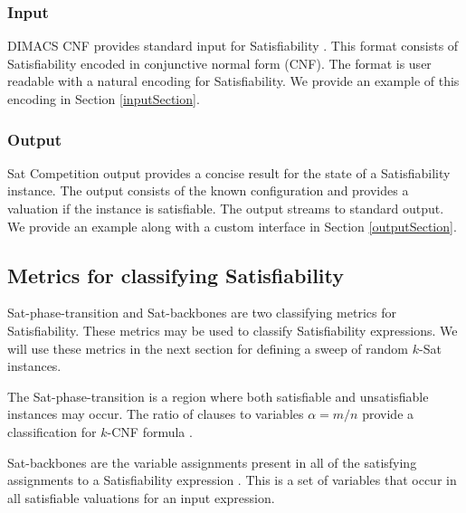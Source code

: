 		\subsubsection{Input}
		
DIMACS CNF provides standard input for {\sc Satisfiability} \cite{dimacsFormat}.  This format consists of {\sc Satisfiability} encoded in conjunctive normal form (CNF).  The format is user readable with a natural encoding for {\sc Satisfiability}.  We provide an example of this encoding in Section \ref{inputSection}.
		
		\subsubsection{Output}
		
{\sc Sat} Competition output \cite{satcompetition} provides a concise result for the state of a {\sc Satisfiability} instance.  The output consists of the known configuration and provides a valuation if the instance is satisfiable.  The output streams to standard output.  We provide an example along with a custom interface in Section \ref{outputSection}.
	
	\subsection{Metrics for classifying {\sc Satisfiability}}

{\sc Sat}-phase-transition and {\sc Sat}-backbones are two classifying metrics for {\sc Satisfiability}.  These metrics may be used to classify {\sc Satisfiability} expressions.  We will use these metrics in the next section for defining a sweep of random $k$-{\sc Sat} instances.
		

The {\sc Sat}-phase-transition is a region where both satisfiable and unsatisfiable instances may occur.  The ratio of clauses to variables $\alpha = m/n$ provide a classification for $k$-\textsf{CNF} formula \cite{Doherty08thehandbook,Gent94thesat}.
		

{\sc Sat}-backbones are the variable assignments present in all of the satisfying assignments to a {\sc Satisfiability} expression \cite{Zhang2001}.  This is a set of variables that occur in all satisfiable valuations for an input expression.  

